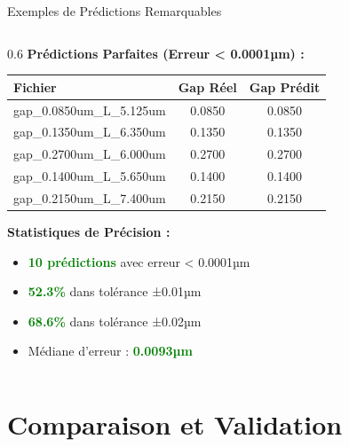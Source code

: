 \documentclass[aspectratio=169]{beamer}
\begin{document}
\begin{frame}{Exemples de Prédictions Remarquables}
    \begin{columns}
        \begin{column}{0.6\textwidth}
            \textbf{Prédictions Parfaites (Erreur < 0.0001µm) :}
            \begin{table}[h]
                \centering
                \scriptsize
                \begin{tabular}{@{}lcc@{}}
                    \toprule
                    \textbf{Fichier} & \textbf{Gap Réel} & \textbf{Gap Prédit} \\
                    \midrule
                    gap\_0.0850um\_L\_5.125um & 0.0850 & 0.0850 \\
                    gap\_0.1350um\_L\_6.350um & 0.1350 & 0.1350 \\
                    gap\_0.2700um\_L\_6.000um & 0.2700 & 0.2700 \\
                    gap\_0.1400um\_L\_5.650um & 0.1400 & 0.1400 \\
                    gap\_0.2150um\_L\_7.400um & 0.2150 & 0.2150 \\
                    \bottomrule
                \end{tabular}
            \end{table}
        
            \textbf{Statistiques de Précision :}
            \begin{itemize}
                \item \textcolor{green}{\textbf{10 prédictions}} avec erreur < 0.0001µm
                \item \textcolor{green}{\textbf{52.3\%}} dans tolérance ±0.01µm
                \item \textcolor{green}{\textbf{68.6\%}} dans tolérance ±0.02µm
                \item Médiane d'erreur : \textcolor{green}{\textbf{0.0093µm}}
            \end{itemize}
        \end{column}
        
    \end{columns}
\end{frame}

\section{Comparaison et Validation}
\end{document}
